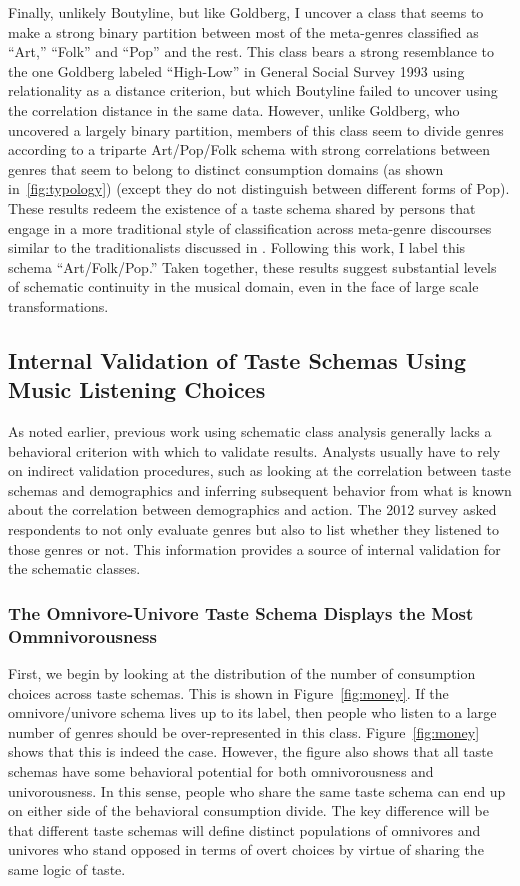 \documentclass[preprint, authoryear,11pt, 3p]{elsarticle}
\begin{document}
Finally, unlikely Boutyline, but like Goldberg, I uncover a class that seems to make a strong binary partition between most of the meta-genres classified as ``Art,'' ``Folk'' and ``Pop'' and the rest. This class bears a strong resemblance to the one Goldberg labeled ``High-Low'' in General Social Survey 1993 using relationality as a distance criterion, but which Boutyline failed to uncover using the correlation distance in the same data. However, unlike Goldberg, who uncovered a largely binary partition, members of this class seem to divide genres according to a triparte Art/Pop/Folk schema with strong correlations between genres that seem to belong to distinct consumption domains (as shown in~\ref{fig:typology}) (except they do not distinguish between different forms of Pop). These results redeem the existence of a taste schema shared by persons that engage in a more traditional style of classification across meta-genre discourses similar to the traditionalists discussed in \citet{van2001social}. Following this work, I label this schema ``Art/Folk/Pop.'' Taken together, these results suggest substantial levels of schematic continuity in the musical domain, even in the face of large scale transformations. 

\subsection{Internal Validation of Taste Schemas Using Music Listening Choices}
As noted earlier, previous work using schematic class analysis generally lacks a behavioral criterion with which to validate results. Analysts usually have to rely on indirect validation procedures, such as looking at the correlation between taste schemas and demographics \citep{goldberg2011mapping, baldassarri2014neither} and inferring subsequent behavior from what is known about the correlation between demographics and action. The 2012 survey asked respondents to not only evaluate genres but also to list whether they listened to those genres or not. This information provides a source of internal validation for the schematic classes. 

\subsubsection{The Omnivore-Univore Taste Schema Displays the Most Ommnivorousness}
First, we begin by looking at the distribution of the number of consumption choices across taste schemas. This is shown in Figure~\ref{fig:money}. If the omnivore/univore schema lives up to its label, then people who listen to a large number of genres should be over-represented in this class. Figure~\ref{fig:money} shows that this is indeed the case. However, the figure also shows that all taste schemas have some behavioral potential for both omnivorousness and univorousness. In this sense, people who share the same taste schema can end up on either side of the behavioral consumption divide. The key difference will be that different taste schemas will define distinct populations of omnivores and univores who stand opposed in terms of overt choices by virtue of sharing the same logic of taste.
\end{document}

